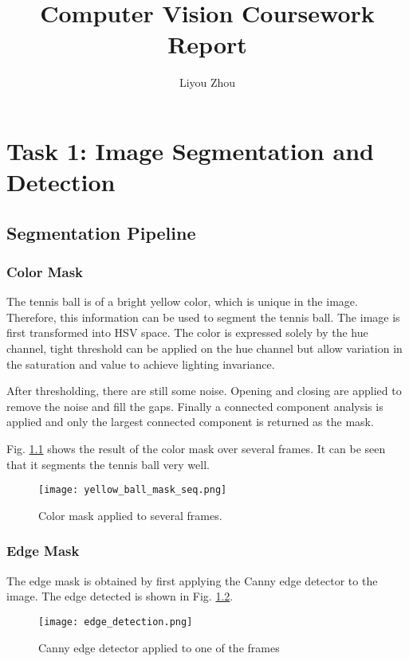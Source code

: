 \documentclass{report}
\title{Computer Vision Coursework Report}
\author{Liyou Zhou}
\begin{document}
\maketitle


\chapter{Task 1: Image Segmentation and Detection}

\section{Segmentation Pipeline}

\subsection{Color Mask}

The tennis ball is of a bright yellow color, which is unique in the image. Therefore, this information can be used to segment the tennis ball. The image is first transformed into HSV space. The color is expressed solely by the hue channel, tight threshold can be applied on the hue channel but allow variation in the saturation and value to achieve lighting invariance.

After thresholding, there are still some noise. Opening and closing are applied to remove the noise and fill the gaps. Finally a connected component analysis is applied and only the largest connected component is returned as the mask.

Fig. \ref{fig:color_mask} shows the result of the color mask over several frames. It can be seen that it segments the tennis ball very well.

\begin{figure}[ht]
    \centering
    \texttt{[image: yellow\_ball\_mask\_seq.png]}
    \caption{Color mask applied to several frames.}
    \label{fig:color_mask}
\end{figure}

\subsection{Edge Mask}

The edge mask is obtained by first applying the Canny edge detector to the image. The edge detected is shown in Fig. \ref{fig:edge_mask}.

\begin{figure}
    \centering
    \texttt{[image: edge\_detection.png]}
    \caption{Canny edge detector applied to one of the frames}
    \label{fig:edge_mask}
\end{figure}
\end{document}
